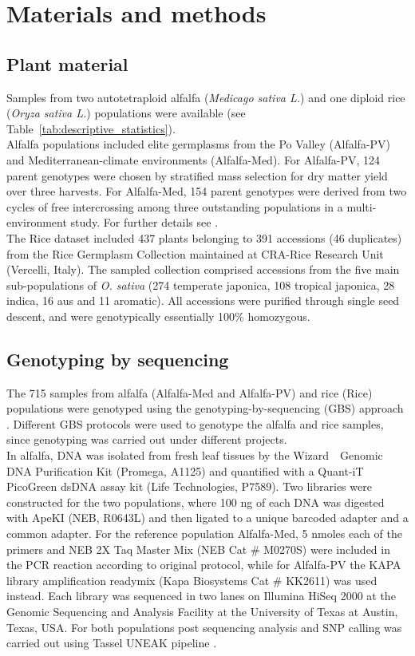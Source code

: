 \section{Materials and methods}

\subsection{Plant material}
\label{sec:plant_material}

Samples from two autotetraploid alfalfa (\emph{Medicago sativa L.}) and one diploid rice (\emph{Oryza sativa L.}) populations were available (see Table~\ref{tab:descriptive_statistics}).\\
Alfalfa populations included elite germplasms from the Po Valley (Alfalfa-PV) and Mediterranean-climate environments (Alfalfa-Med). For Alfalfa-PV, 124 parent genotypes were chosen by stratified mass selection for dry matter yield over three harvests. For Alfalfa-Med, 154 parent genotypes were derived from two cycles of free intercrossing among three outstanding populations in a multi-environment study. For further details see \cite{Annicchiarico2015}. \\
The Rice dataset included 437 plants belonging to 391 accessions (46 duplicates) from the Rice Germplasm Collection maintained at CRA-Rice Research Unit (Vercelli, Italy). The sampled collection comprised accessions from the five main sub-populations of \emph{O. sativa} (274 temperate japonica, 108 tropical japonica, 28 indica, 16 aus and 11 aromatic). All accessions were purified through single seed descent, and were genotypically essentially 100\% homozygous.

\subsection{Genotyping by sequencing}
\label{sec:overview}

The 715 samples from alfalfa (Alfalfa-Med and Alfalfa-PV) and rice (Rice) populations were genotyped using the genotyping-by-sequencing (GBS) approach \cite{elshire_robust_2011}. Different GBS protocols were used to genotype the alfalfa and rice samples, since genotyping was carried out under different projects.\\
In alfalfa, DNA was isolated from fresh leaf tissues by the Wizard~\textregistered~Genomic DNA Purification Kit (Promega, A1125) and quantified with a Quant-iT PicoGreen dsDNA assay kit (Life Technologies, P7589). Two libraries were constructed for the two populations, where 100 ng of each DNA was digested with ApeKI (NEB, R0643L) and then ligated to a unique barcoded adapter and a common adapter. For the reference population Alfalfa-Med, 5 nmoles each of the primers and NEB 2X Taq Master Mix (NEB Cat \# M0270S) were included in the PCR reaction according to \cite{elshire_robust_2011} original protocol, while for Alfalfa-PV the KAPA library amplification readymix (Kapa Biosystems Cat \# KK2611) was used instead. Each library was sequenced in two lanes on Illumina HiSeq 2000 at the Genomic Sequencing and Analysis Facility at the University of Texas at Austin, Texas, USA. For both populations post sequencing analysis and SNP calling was carried out using Tassel UNEAK pipeline \cite{lu_switchgrass_2013}.

